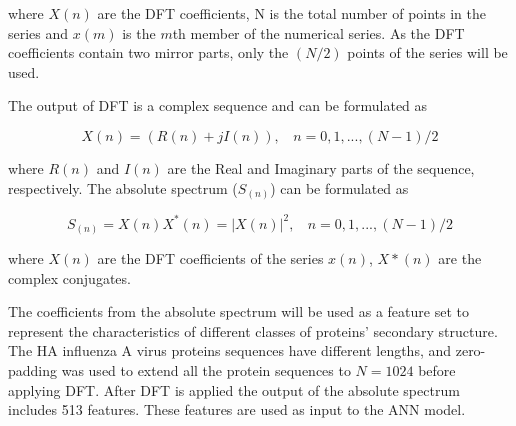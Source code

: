 \documentclass[letterpaper, 10 pt, conference]{ieeeconf}  %
\begin{document}
\noindent where $X(n)$ are the DFT coefficients, N is the total number of points in the series and $x(m)$ is the $m$th member of the numerical series. As the DFT coefficients contain two mirror parts, only the $(N/2)$ points of the series will be used.

\noindent The output of DFT is a complex sequence and can be formulated as

\begin{equation}
X(n) = (R(n) + jI(n)), \:\:\:\:  n = 0,1,...,(N-1)/2
\end{equation}

\vspace{3 mm}
\noindent where $R(n)$ and $I(n)$ are the Real and Imaginary parts of the sequence, respectively.
\noindent The absolute spectrum ($S_{(n)}$) can be formulated as 

\begin{equation}
S_{(n)} = X(n)X^{*}(n) = \left|X(n)\right|^{2}, \:\:\:\:  n = 0,1,...,(N-1)/2
\end{equation}

\vspace{3 mm}
\noindent where $X(n)$ are the DFT coefficients of the series $x(n)$, $X*(n)$ are the complex conjugates.

\vspace{5 mm}

The coefficients from the absolute spectrum will be used as a feature set to represent the characteristics of different classes of proteins' secondary structure. The HA influenza A virus proteins sequences have different lengths, and zero-padding was used to extend all the protein sequences to $N = 1024$ before applying DFT. After DFT is applied the output of the absolute spectrum includes 513 features. These features are used as input to the ANN model.  
\end{document}
